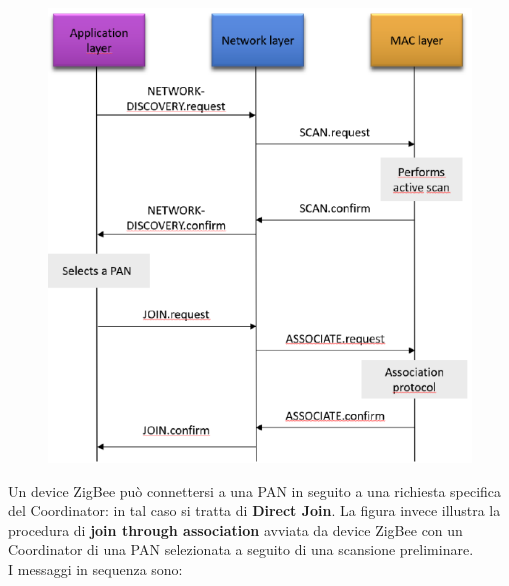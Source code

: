 \begin{figure}[htbp]
   \centering
   \includegraphics{images/questions/Schermata del 2023-10-19 15-30-53.png}
   \label{fig:dom6}
\end{figure}

Un device ZigBee può connettersi a una PAN in seguito a una richiesta specifica del Coordinator: in tal caso si tratta di \textbf{Direct Join}.
La figura invece illustra la procedura di \textbf{join through association} avviata da device ZigBee con un Coordinator di una PAN selezionata a seguito di una scansione preliminare.\\ 
I messaggi in sequenza sono:

